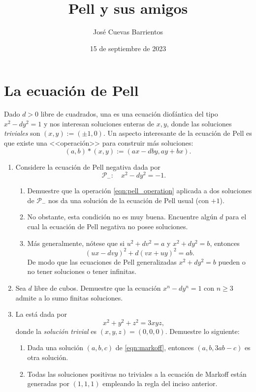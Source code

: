 \documentclass[11pt, reqno]{amsart}
\title{Pell y sus amigos}
\date{15 de septiembre de 2023}
\author[José Cuevas]{José Cuevas Barrientos}
\begin{document}
\maketitle

\section{La ecuación de Pell}
Dado $d > 0$ libre de cuadrados, una  es una ecuación diofántica del tipo $x^2 - dy^2 = 1$
y nos interesan soluciones enteras de $x, y$, donde las soluciones \textit{triviales} son $(x, y) := (\pm 1, 0)$.
Un aspecto interesante de la ecuación de Pell es que existe una <<operación>> para construir más soluciones:
\begin{equation}
	(a, b) * (x, y) := (ax - dby, ay + bx).
	\label{eqn:pell_operation}
\end{equation}

\begin{enumerate}
	\item Considere la ecuación de Pell negativa dada por
		\[
			\mathcal{P}_-\colon \quad x^2 - dy^2 = -1.
		\]
		\begin{enumerate}
			\item Demuestre que la operación \eqref{eqn:pell_operation} aplicada a dos soluciones de $\mathcal{P}_-$
				nos da una solución de la ecuación de Pell usual (con $+1$).
			\item No obstante, esta condición no es muy buena.
				Encuentre algún $d$ para el cual la ecuación de Pell negativa no posee soluciones.
			\item Más generalmente, nótese que si $u^2 + dv^2 = a$ y $x^2 + dy^2 = b$, entonces
				$$ (ux - dvy)^2 + d(vx + uy)^2 = ab. $$
				De modo que las ecuaciones de Pell generalizadas $x^2 + dy^2 = b$ pueden o no tener soluciones o tener infinitas.
		\end{enumerate}
	\item Sea $d$ libre de cubos.
		Demuestre que la ecuación $x^n - dy^n = 1$ con $n \ge 3$ admite a lo sumo finitas soluciones.
	\item La  está dada por
		\begin{equation}
			x^2 + y^2 + z^2 = 3xyz,
			\label{eqn:markoff}
		\end{equation}
		donde la \textit{solución trivial} es $(x, y, z) = (0, 0, 0)$.
		Demuestre lo siguiente:
		\begin{enumerate}
			\item Dada una solución $(a, b, c)$ de \eqref{eqn:markoff}, entonces $(a, b, 3ab - c)$ es otra solución.
			\item Todas las soluciones positivas no triviales a la ecuación de Markoff están generadas por $(1, 1, 1)$
				empleando la regla del inciso anterior.
		\end{enumerate}
\end{enumerate}
\end{document}
